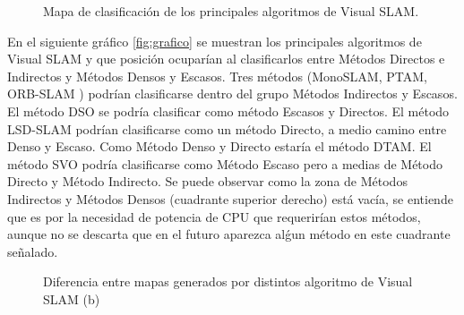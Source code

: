 \begin{figure}[H]
\begin{center}
\end{center}
\caption{Mapa de clasificación de los principales algoritmos de Visual SLAM. }
\end{figure}
En el siguiente gráfico \ref{fig:grafico} se muestran los principales algoritmos de Visual SLAM y que posición ocuparían al clasificarlos entre Métodos Directos e Indirectos y Métodos Densos y Escasos.
Tres métodos (MonoSLAM, PTAM, ORB-SLAM ) podrían clasificarse dentro del grupo Métodos Indirectos y Escasos.
El método DSO se podría clasificar como método Escasos y Directos.
El método LSD-SLAM podrían clasificarse como un método Directo, a medio camino entre Denso y Escaso.
Como Método Denso y Directo estaría el método DTAM.
El método SVO podría clasificarse como Método Escaso pero a medias de Método Directo y Método Indirecto.
Se puede observar como la zona de Métodos Indirectos y Métodos Densos (cuadrante superior derecho) está vacía, se entiende que es por la necesidad de potencia de CPU que requerirían estos métodos, aunque no se descarta que en el futuro aparezca alǵun método en este cuadrante señalado.

\begin{figure}[H]
\begin{center}
\end{center}
\caption{ Diferencia entre mapas generados por distintos algoritmo de Visual SLAM (b)}
\end{figure}

